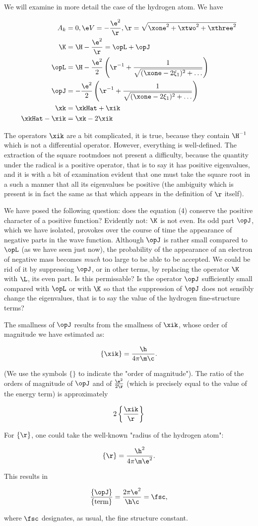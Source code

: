 \documentclass{article}
\newcommand{\uequ}[1]{
\begin{equation*}
#1
\end{equation*}
}
\newcommand{\var}[1]{#1}
\newcommand{\inv}[1]{\frac{1}{#1}}
\newcommand{\opinv}[1]{{#1}^{-1}}
\renewcommand{\it}[1]{\textit{#1}}
\newcommand{\xiX}[1]{\var{\xi}_{#1}}
\newcommand{\Ai}[1]{\var{A}_{#1}}
\newcommand{\Ak}{\Ai{k}}
\newcommand{\V}{\var{V}}
\begin{document}
We will examine in more detail the case of the hydrogen atom. We have
\uequ{
\begin{split}
\Ak &= 0, \e\V = -\frac{\e^2}{\r}, \r = \sqrt{\xone^2+\xtwo^2+\xthree^2} \\
\K &= \H - \frac{\e^2}{\r} = \opL + \opJ \\
\opL &= \H - \frac{\e^2}{2}\left(\opinv{\r} + \inv{\sqrt{(\xone - 2\xiX{1})^2+\dots}}\right)\\
\opJ &= -\frac{\e^2}{2}\left(\opinv{\r} + \inv{\sqrt{(\xone - 2\xiX{1})^2+\dots}}\right)\\
\xk &= \xkHat + \xik \\
\xkHat - \xik &= \xk - 2\xik
\end{split}
}
The operators $\xik$ are a bit complicated, it is true, because they contain $\opinv{\H}$ which is not a differential operator. However, everything is well-defined. The extraction of the square rootmdoes not present a difficulty, because the quantity under the radical is a positive operator, that is to say it has positive eigenvalues, and it is with a bit of examination evident that one must take the square root in a such a manner that all its eigenvalues be positive (the ambiguity which is present is in fact the same as that which appears in the definition of $\r$ itself).

We have posed the following question: does the equation (4) conserve the positive character of a positive function? Evidently not: $\K$ is not even. Its odd part $\opJ$, which we have isolated, provokes over the course of time the appearance of negative parts in the wave function. Although $\opJ$ is rather small compared to $\opL$ (as we have seen just now), the probability of the appearance of an electron of negative mass becomes \it{much} too large to be able to be accepted.
We could be rid of it by suppressing $\opJ$, or in other terms, by replacing the operator $\K$ with $\L$, its even part. Is this permissable? Is the operator $\opJ$ sufficiently small compared with $\opL$ or with $\K$ so that the suppression of $\opJ$ does not sensibly change the eigenvalues, that is to say the value of the hydrogen fine-structure terms?

The smallness of $\opJ$ results from the smallness of $\xik$, whose order of magnitude we have estimated as:
\uequ{
\left\{\xik\right\} = \frac{\h}{4\pi\m\c}.
}
(We use the symbols $\{\}$ to indicate the "order of magnitude"). The ratio of the orders of magnitude of $\opJ$ and of $\frac{\e^2}{2\r}$ (which is precisely equal to the value of the energy term) is approximately
\uequ{
2\left\{
\frac{\xik}{\r}
\right\}
}
For $\{\r\}$, one could take the well-known "radius of the hydrogen atom":
\uequ{
\{\r\} = \frac{\h^2}{4\pi\m\e^2}.
}
This results in
\uequ{
\frac{\{\opJ\}}{\{\text{term}\}} = \frac{2\pi\e^2}{\h\c} = \fsc,
}
where $\fsc$ designates, as usual, the fine structure constant.
\end{document}
